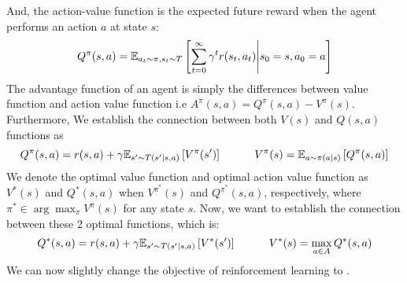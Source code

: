 And, the action-value function is the expected future reward when the agent performs an action $a$ at state $s$: 
\begin{equation}
    Q^\pi(s, a) = \mathbb{E}_{a_t \sim \pi, s_t \sim T}\left[ \sum^\infty_{t=0} \gamma^t r(s_t, a_t) \Bigg| s_0 = s, a_0 = a \right]
\end{equation}
The advantage function of an agent is simply the differences between value function and action value function i.e $A^{\pi}(s, a) = Q^\pi(s, a) - V^\pi(s)$. Furthermore, We establish the connection between both $V(s)$ and $Q(s, a)$ functions as
\begin{equation}
    \label{eqn:chap2-Q-and-V}
    Q^\pi(s, a) = r(s, a) + \gamma \mathbb{E}_{s' \sim T(s' | s, a)}\left[ V^\pi(s') \right] \quad \quad \quad V^\pi(s) = \mathbb{E}_{a \sim \pi(a | s)} \left[ Q^\pi(s, a) \right]
\end{equation}
We denote the optimal value function and optimal action value function as $V^*(s)$ and $Q^*(s, a)$ when $V^{\pi^*}(s)$ and $Q^{\pi^*}(s, a)$, respectively, where $\pi^* \in \arg\max_{\pi} V^{\pi}(s)$ for any state $s$. Now, we want to establish the connection between these 2 optimal functions, which is:
\begin{equation}
\label{eqn:chap2-optim-Q-and-V}
    Q^*(s, a) = r(s, a) + \gamma \mathbb{E}_{s' \sim T(s' | s, a)}\left[ V^*(s') \right] \quad \quad \quad V^*(s) =\max_{a\in A} Q^*(s, a)
\end{equation}
We can now slightly change the objective of reinforcement learning to .

